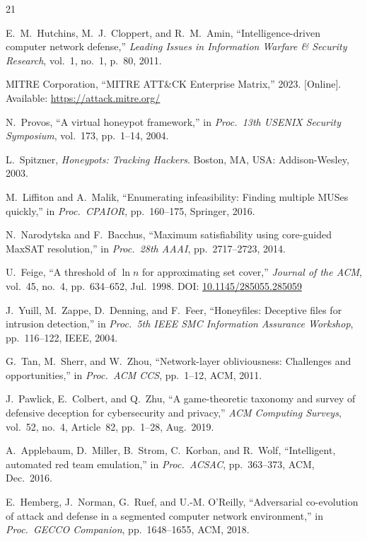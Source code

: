 \documentclass[journal]{IEEEtran}
\begin{document}
\begin{thebibliography}{21}

E.~M.~Hutchins, M.~J.~Cloppert, and R.~M.~Amin,
``Intelligence-driven computer network defense,''
\textit{Leading Issues in Information Warfare \& Security
Research}, vol.~1, no.~1, p.~80, 2011.

MITRE Corporation,
``MITRE ATT\&CK Enterprise Matrix,'' 2023.
[Online]. Available: \url{https://attack.mitre.org/}

N.~Provos,
``A virtual honeypot framework,''
in \textit{Proc.\ 13th USENIX Security Symposium},
vol.~173, pp.~1--14, 2004.

L.~Spitzner,
\textit{Honeypots: Tracking Hackers}.
Boston, MA, USA: Addison-Wesley, 2003.

M.~Liffiton and A.~Malik,
``Enumerating infeasibility: Finding multiple MUSes quickly,''
in \textit{Proc.\ CPAIOR}, pp.~160--175, Springer, 2016.

N.~Narodytska and F.~Bacchus,
``Maximum satisfiability using core-guided MaxSAT resolution,''
in \textit{Proc.\ 28th AAAI}, pp.~2717--2723, 2014.

U.~Feige,
``A threshold of $\ln n$ for approximating set cover,''
\textit{Journal of the ACM}, vol.~45, no.~4,
pp.~634--652, Jul.~1998.
DOI: \href{https://doi.org/10.1145/285055.285059}
{10.1145/285055.285059}

J.~Yuill, M.~Zappe, D.~Denning, and F.~Feer,
``Honeyfiles: Deceptive files for intrusion detection,''
in \textit{Proc.\ 5th IEEE SMC Information Assurance
Workshop}, pp.~116--122, IEEE, 2004.

G.~Tan, M.~Sherr, and W.~Zhou,
``Network-layer obliviousness: Challenges and opportunities,''
in \textit{Proc.\ ACM CCS}, pp.~1--12, ACM, 2011.

J.~Pawlick, E.~Colbert, and Q.~Zhu,
``A game-theoretic taxonomy and survey of defensive deception
for cybersecurity and privacy,''
\textit{ACM Computing Surveys}, vol.~52, no.~4, Article~82,
pp.~1--28, Aug.~2019.

A.~Applebaum, D.~Miller, B.~Strom, C.~Korban, and R.~Wolf,
``Intelligent, automated red team emulation,''
in \textit{Proc.\ ACSAC}, pp.~363--373, ACM, Dec.~2016.

E.~Hemberg, J.~Norman, G.~Ruef, and U.-M. O'Reilly,
``Adversarial co-evolution of attack and defense in a
segmented computer network environment,''
in \textit{Proc.\ GECCO Companion}, pp.~1648--1655,
ACM, 2018.


\end{thebibliography}
\end{document}
